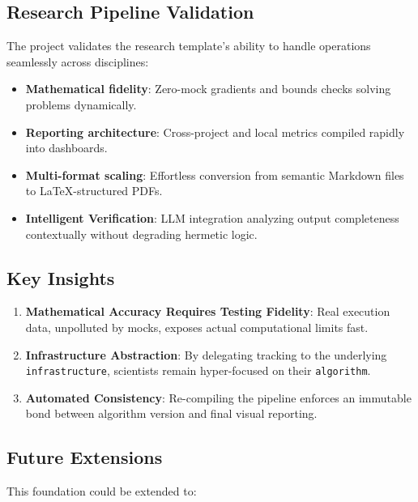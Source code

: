 \documentclass[
]{article}
\providecommand{\tightlist}{%
  \setlength{\itemsep}{0pt}\setlength{\parskip}{0pt}}
\begin{document}
\subsection{Research Pipeline
Validation}\label{research-pipeline-validation}

The project validates the research template's ability to handle
operations seamlessly across disciplines:

\begin{itemize}
\tightlist
\item
  \textbf{Mathematical fidelity}: Zero-mock gradients and bounds checks
  solving problems dynamically.
\item
  \textbf{Reporting architecture}: Cross-project and local metrics
  compiled rapidly into dashboards.
\item
  \textbf{Multi-format scaling}: Effortless conversion from semantic
  Markdown files to LaTeX-structured PDFs.
\item
  \textbf{Intelligent Verification}: LLM integration analyzing output
  completeness contextually without degrading hermetic logic.
\end{itemize}

\subsection{Key Insights}\label{key-insights}

\begin{enumerate}
\def\labelenumi{\arabic{enumi}.}
\tightlist
\item
  \textbf{Mathematical Accuracy Requires Testing Fidelity}: Real
  execution data, unpolluted by mocks, exposes actual computational
  limits fast.
\item
  \textbf{Infrastructure Abstraction}: By delegating tracking to the
  underlying \texttt{infrastructure}, scientists remain hyper-focused on
  their \texttt{algorithm}.
\item
  \textbf{Automated Consistency}: Re-compiling the pipeline enforces an
  immutable bond between algorithm version and final visual reporting.
\end{enumerate}

\subsection{Future Extensions}\label{future-extensions}

This foundation could be extended to:
\end{document}
